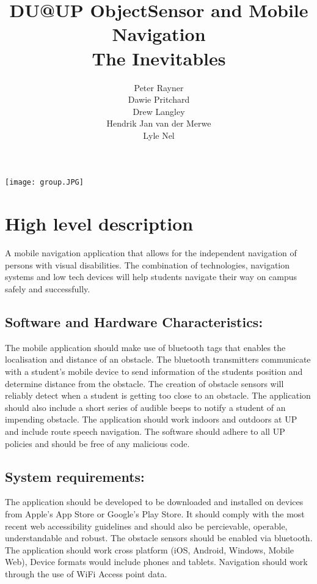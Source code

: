 \documentclass{article}
\title{DU@UP ObjectSensor and Mobile Navigation \\
The Inevitables
}
\author{  
            Peter Rayner\\
            Dawie Pritchard\\
            Drew Langley\\
            Hendrik Jan van der Merwe\\
            Lyle Nel\\
        }
\begin{document}
\maketitle

\texttt{[image: group.JPG]}

\newpage

\tableofcontents

\newpage


\section{High level description}
A mobile navigation application that allows for the independent navigation of persons with visual disabilities. The combination of technologies, navigation systems and low tech devices will help students navigate their way on campus safely and successfully. 

\subsection{Software and Hardware Characteristics:}
The mobile application should make use of bluetooth tags that enables the localisation and distance of an obstacle. The bluetooth transmitters communicate with a student's mobile device to send information of the students position and determine distance from the obstacle. The creation of obstacle sensors will reliably detect when a student is getting too close to an obstacle. The application should also include a short series of audible beeps to notify a student of an impending obstacle. The application should work indoors and outdoors at UP and include route speech navigation. The software should adhere to all UP policies and should be free of any malicious code.

\subsection{System requirements:}
The application should be developed to be downloaded and installed on devices from Apple's App Store or Google's Play Store.
It should comply with the most recent web accessibility guidelines and should also be percievable, operable, understandable and robust.
The obstacle sensors should be enabled via bluetooth.
The application should work cross platform (iOS, Android, Windows, Mobile Web), Device formats would include phones and tablets. Navigation should work through the use of WiFi Access point data.
\end{document}

